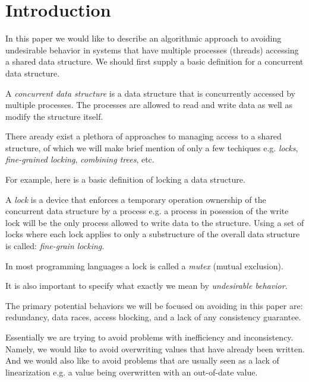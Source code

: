 \section{Introduction}

In this paper we would like to describe an algorithmic approach to avoiding undesirable behavior in systems that have multiple processes (threads) accessing a shared data structure. We should first supply a basic definition for a concurrent data structure.

\begin{con-def}
	\label{cds}
	A \textit{concurrent data structure} is a data structure that is concurrently accessed by multiple processes. The processes are allowed to read and write data as well as modify the structure itself.
\end{con-def}

There aready exist a plethora of approaches to managing access to a shared structure, of which we will make brief mention of only a few techiques e.g. \textit{locks}, \textit{fine-grained locking}, \textit{combining trees}, etc.

For example, here is a basic definition of locking a data structure.

\begin{con-def}[Locking]
	\label{locks}
	A \textit{lock} is a device that enforces a temporary operation ownership of the concurrent data structure by a process e.g. a process in posession of the write lock will be the only process allowed to write data to the structure. Using a set of locks where each lock applies to only a substructure of the overall data structure is called: \textit{fine-grain locking}.
\end{con-def}

In most programming languages a lock is called a \textit{mutex} (mutual exclusion).

It is also important to specify what exactly we mean by \textit{undesirable behavior}.

\begin{con-def}
	\label{ub}
	The primary potential behaviors we will be focused on avoiding in this paper are: redundancy, data races, access blocking, and a lack of any consistency guarantee.
\end{con-def}

Essentially we are trying to avoid problems with inefficiency and inconsistency. Namely, we would like to avoid overwriting values that have already been written. And we would also like to avoid problems that are usually seen as a lack of linearization e.g. a value being overwritten with an out-of-date value.

